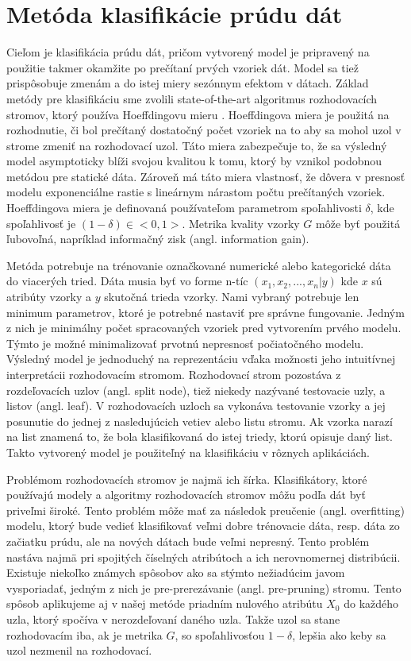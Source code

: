 \section{Metóda klasifikácie prúdu dát}
\label{method-klasifikacia-prudu-dat}
Cieľom je klasifikácia prúdu dát, pričom vytvorený model je pripravený na použitie takmer okamžite po prečítaní prvých vzoriek dát. Model sa tiež prispôsobuje zmenám a do istej miery sezónnym efektom v dátach. Základ metódy pre klasifikáciu sme zvolili state-of-the-art algoritmus rozhodovacích stromov, ktorý používa Hoeffdingovu mieru \citep{domingos2000mining, gaber2005mining, krempl2014open}. Hoeffdingova miera je použitá na rozhodnutie, či bol prečítaný dostatočný počet vzoriek na to aby sa mohol uzol v strome zmeniť na rozhodovací uzol. Táto miera zabezpečuje to, že sa výsledný model asymptoticky blíži svojou kvalitou k tomu, ktorý by vznikol podobnou metódou pre statické dáta. Zároveň má táto miera vlastnosť, že  dôvera v presnosť modelu exponenciálne rastie s lineárnym nárastom počtu prečítaných vzoriek. Hoeffdingova miera je definovaná používateľom parametrom spoľahlivosti $\delta$, kde spoľahlivosť je $(1-\delta) \in <0,1>$. Metrika kvality vzorky $G$ môže byť použitá ľubovoľná, napríklad informačný zisk (angl. information gain).
\par
Metóda potrebuje na trénovanie označkované numerické alebo kategorické dáta do viacerých tried. Dáta musia byť vo forme n-tíc $(x_1, x_2, ..., x_n | y)$ kde $x$ sú atribúty vzorky a $y$ skutočná trieda vzorky. Nami vybraný potrebuje len minimum parametrov, ktoré je potrebné nastaviť pre správne fungovanie. Jedným z nich je minimálny počet spracovaných vzoriek pred vytvorením prvého modelu. Týmto je možné minimalizovať prvotnú nepresnosť počiatočného modelu. Výsledný model je jednoduchý na reprezentáciu vďaka možnosti jeho intuitívnej interpretácii rozhodovacím stromom. Rozhodovací strom pozostáva z rozdeľovacích uzlov (angl. split node), tiež niekedy nazývané testovacie uzly, a listov (angl. leaf). V rozhodovacích uzloch sa vykonáva testovanie vzorky a jej posunutie do jednej z nasledujúcich vetiev alebo listu stromu. Ak vzorka narazí na list znamená to, že bola klasifikovaná do istej triedy, ktorú opisuje daný list. Takto vytvorený model je použiteľný na klasifikáciu v rôznych aplikáciách.
\par
Problémom rozhodovacích stromov je najmä ich šírka. Klasifikátory, ktoré používajú modely a algoritmy rozhodovacích stromov môžu podľa dát byť priveľmi široké. Tento problém môže mať za následok preučenie (angl. overfitting) modelu, ktorý bude vedieť klasifikovať veľmi dobre trénovacie dáta, resp. dáta zo začiatku prúdu, ale na nových dátach bude veľmi nepresný. Tento problém nastáva najmä pri spojitých číselných atribútoch a ich nerovnomernej distribúcii. Existuje niekoľko známych spôsobov ako sa stýmto nežiadúcim javom vysporiadať, jedným z nich je pre-prerezávanie (angl. pre-pruning) stromu. Tento spôsob aplikujeme aj v našej metóde priadním nulového atribútu $X_0$ do každého uzla, ktorý spočíva v nerozdeľovaní daného uzla. Takže uzol sa stane rozhodovacím iba, ak je metrika $G$, so spoľahlivosťou $1-\delta$, lepšia ako keby sa uzol nezmenil na rozhodovací.
